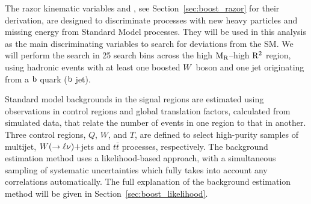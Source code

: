 The razor kinematic variables \mr and \rsq, see Section~\ref{sec:boost_razor} for their derivation,
are designed to discriminate processes with new heavy particles and missing energy from Standard
Model processes.
They will be used in this analysis as the main discriminating variables to search for deviations
from the SM. We will perform the search in 25 search bins across the high $\mathrm{M_R}$--high $\mathrm{R^2}$ region,
using hadronic events with at least one boosted $W$ boson and one jet originating from a $\mathrm{b}$
quark (\ie $\mathrm{b}$ jet). 

Standard model backgrounds in the signal regions are estimated using observations in control regions
and global translation factors, calculated from simulated data, that relate the number of events in
one region to that in another. 
Three control regions, $Q$, $W$, and $T$, are defined to select high-purity samples of multijet,
$W(\rightarrow \ell\nu)+$jets and $t\bar{t}$ processes, respectively.  
The background estimation method uses a likelihood-based approach, with a simultaneous sampling
of systematic uncertainties which fully takes into account any correlations automatically.
The full explanation of the background estimation method will be given in
Section~\ref{sec:boost_likelihood}. 



